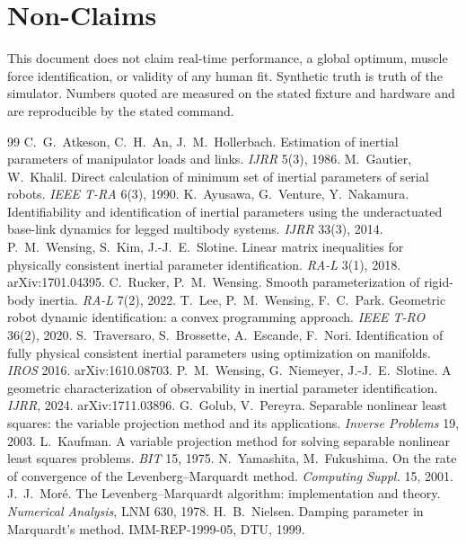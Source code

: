 \documentclass[11pt,a4paper]{article}
\begin{document}
\section{Non-Claims}
This document does not claim real-time performance, a global optimum, muscle
force identification, or validity of any human fit.  Synthetic truth is truth
of the simulator.  Numbers quoted are measured on the stated fixture and
hardware and are reproducible by the stated command.

\begin{thebibliography}{99}
 C.~G.~Atkeson, C.~H.~An, J.~M.~Hollerbach. Estimation of inertial parameters of manipulator loads and links. \emph{IJRR} 5(3), 1986.
 M.~Gautier, W.~Khalil. Direct calculation of minimum set of inertial parameters of serial robots. \emph{IEEE T-RA} 6(3), 1990.
 K.~Ayusawa, G.~Venture, Y.~Nakamura. Identifiability and identification of inertial parameters using the underactuated base-link dynamics for legged multibody systems. \emph{IJRR} 33(3), 2014.
 P.~M.~Wensing, S.~Kim, J.-J.~E.~Slotine. Linear matrix inequalities for physically consistent inertial parameter identification. \emph{RA-L} 3(1), 2018. arXiv:1701.04395.
 C.~Rucker, P.~M.~Wensing. Smooth parameterization of rigid-body inertia. \emph{RA-L} 7(2), 2022.
 T.~Lee, P.~M.~Wensing, F.~C.~Park. Geometric robot dynamic identification: a convex programming approach. \emph{IEEE T-RO} 36(2), 2020.
 S.~Traversaro, S.~Brossette, A.~Escande, F.~Nori. Identification of fully physical consistent inertial parameters using optimization on manifolds. \emph{IROS} 2016. arXiv:1610.08703.
 P.~M.~Wensing, G.~Niemeyer, J.-J.~E.~Slotine. A geometric characterization of observability in inertial parameter identification. \emph{IJRR}, 2024. arXiv:1711.03896.
 G.~Golub, V.~Pereyra. Separable nonlinear least squares: the variable projection method and its applications. \emph{Inverse Problems} 19, 2003.
 L.~Kaufman. A variable projection method for solving separable nonlinear least squares problems. \emph{BIT} 15, 1975.
 N.~Yamashita, M.~Fukushima. On the rate of convergence of the Levenberg--Marquardt method. \emph{Computing Suppl.} 15, 2001.
 J.~J.~Mor\'e. The Levenberg--Marquardt algorithm: implementation and theory. \emph{Numerical Analysis}, LNM 630, 1978.
 H.~B.~Nielsen. Damping parameter in Marquardt's method. IMM-REP-1999-05, DTU, 1999.

\end{thebibliography}
\end{document}
